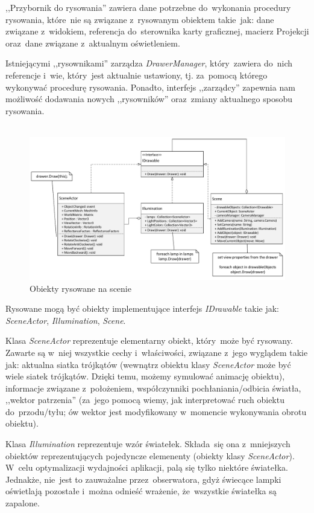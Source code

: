\documentclass[11pt, a4paper, oneside]{scrartcl}
\begin{document}
,,Przybornik do rysowania'' zawiera dane potrzebne do~wykonania procedury rysowania, które~nie są związane z~rysowanym obiektem takie~jak:
dane związane z~widokiem, referencja do~sterownika karty graficznej, macierz Projekcji oraz~dane związane z~aktualnym oświetleniem.

Istniejącymi ,,rysownikami'' zarządza \textit{DrawerManager}, który~zawiera do~nich referencje
i~wie, który~jest aktualnie ustawiony, tj. za~pomocą którego wykonywać procedurę rysowania. Ponadto, interfejs ,,zarządcy'' zapewnia nam możliwość
dodawania nowych ,,rysowników'' oraz~zmiany aktualnego sposobu rysowania. \\ \\
\begin{figure}[H]
	\centering 
	\includegraphics[scale=0.6]{IDrawable.pdf}
	\caption{Obiekty rysowane na scenie}\label{fig:pictures}
\end{figure}
Rysowane mogą być obiekty implementujące interfejs \textit{IDrawable} takie jak: \textit{SceneActor}, \textit{Illumination}, \textit{Scene}.

Klasa \textit{SceneActor} reprezentuje elementarny obiekt, który~może być rysowany. Zawarte są w~niej wszystkie cechy i~właściwości,
związane z~jego wyglądem takie jak: aktualna siatka trójkątów (wewnątrz obiektu klasy \textit{SceneActor} może być wiele siatek trójkątów. Dzięki temu,
możemy symulować animację obiektu), informacje związane z~położeniem, współczynniki pochłaniania/odbicia światła, ,,wektor patrzenia'' (za~jego pomocą
wiemy, jak interpretować ruch obiektu do~przodu/tyłu; ów wektor jest modyfikowany w~momencie wykonywania obrotu obiektu).

Klasa \textit{Illumination} reprezentuje wzór światełek. Składa~się ona z~mniejszych obiektów reprezentujących pojedyncze elemenenty (obiekty klasy \textit{SceneActor}). W~celu optymalizacji wydajności aplikacji, palą się tylko niektóre światełka. Jednakże, nie~jest to zauważalne przez~obserwatora,
gdyż świecące lampki oświetlają pozostałe i~można odnieść wrażenie, że~wszystkie światełka są zapalone. 
\end{document}
